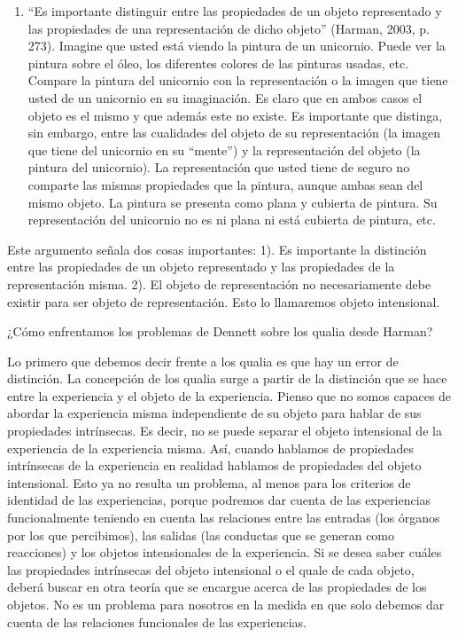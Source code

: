 \documentclass[]{book}
\begin{document}
\begin{refsection}
\begin{enumerate}
\def\labelenumi{\arabic{enumi}.}
\item
  ``Es importante distinguir entre las propiedades de un objeto
  representado y las propiedades de una representación de dicho objeto''
  (Harman, 2003, p. 273). Imagine que usted está viendo la pintura de un
  unicornio. Puede ver la pintura sobre el óleo, los diferentes colores
  de las pinturas usadas, etc. Compare la pintura del unicornio con la
  representación o la imagen que tiene usted de un unicornio en su
  imaginación. Es claro que en ambos casos el objeto es el mismo y que
  además este no existe. Es importante que distinga, sin embargo, entre
  las cualidades del objeto de su representación (la imagen que tiene
  del unicornio en su ``mente'') y la representación del objeto (la
  pintura del unicornio). La representación que usted tiene de seguro no
  comparte las mismas propiedades que la pintura, aunque ambas sean del
  mismo objeto. La pintura se presenta como plana y cubierta de pintura.
  Su representación del unicornio no es ni plana ni está cubierta de
  pintura, etc.
\end{enumerate}

Este argumento señala dos cosas importantes: 1). Es importante la
distinción entre las propiedades de un objeto representado y las
propiedades de la representación misma. 2). El objeto de representación
no necesariamente debe existir para ser objeto de representación. Esto
lo llamaremos objeto intensional.

¿Cómo enfrentamos los problemas de Dennett sobre los qualia desde
Harman?

Lo primero que debemos decir frente a los qualia es que hay un error de
distinción. La concepción de los qualia surge a partir de la distinción
que se hace entre la experiencia y el objeto de la experiencia. Pienso
que no somos capaces de abordar la experiencia misma independiente de su
objeto para hablar de sus propiedades intrínsecas. Es decir, no se puede
separar el objeto intensional de la experiencia de la experiencia misma.
Así, cuando hablamos de propiedades intrínsecas de la experiencia en
realidad hablamos de propiedades del objeto intensional. Esto ya no
resulta un problema, al menos para los criterios de identidad de las
experiencias, porque podremos dar cuenta de las experiencias
funcionalmente teniendo en cuenta las relaciones entre las entradas (los
órganos por los que percibimos), las salidas (las conductas que se
generan como reacciones) y los objetos intensionales de la experiencia.
Si se desea saber cuáles las propiedades intrínsecas del objeto
intensional o el quale de cada objeto, deberá buscar en otra teoría que
se encargue acerca de las propiedades de los objetos. No es un problema
para nosotros en la medida en que solo debemos dar cuenta de las
relaciones funcionales de las experiencias.


\end{refsection}
\end{document}
